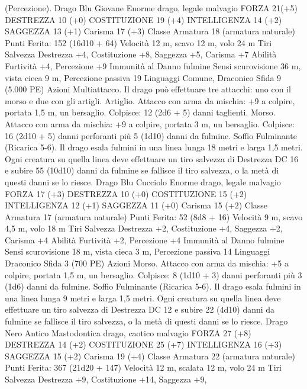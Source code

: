 \begin{multicols}{2}
(Percezione).
Drago Blu Giovane
Enorme drago, legale malvagio
FORZA 21(+5)
DESTREZZA 10 (+0)
COSTITUZIONE 19 (+4)
INTELLIGENZA 14 (+2)
SAGGEZZA 13 (+1)
Carisma 17 (+3)
Classe Armatura 18 (armatura naturale)
\hspace*{0pt}\hfill{Punti Ferita}: 152 (16d10 + 64)
Velocità 12 m, scavo 12 m, volo 24 m
Tiri Salvezza Destrezza +4, Costituzione +8, Saggezza +5,
Carisma +7
Abilità Furtività +4, Percezione +9
Immunità al Danno fulmine
Sensi scurovisione 36 m, vista cieca 9 m, Percezione passiva 19
Linguaggi Comune, Draconico
Sfida 9 (5.000 PE)
Azioni
Multiattacco. Il drago può effettuare tre attacchi: uno con il
morso e due con gli artigli.
Artiglio. Attacco con arma da mischia: +9 a colpire, portata 1,5
m, un bersaglio.
Colpisce: 12 (2d6 + 5) danni taglienti.
Morso. Attacco con arma da mischia: +9 a colpire, portata 3 m,
un bersaglio.
Colpisce: 16 (2d10 + 5) danni perforanti più 5 (1d10) danni da
fulmine.
Soffio Fulminante (Ricarica 5-6). Il drago esala fulmini in una linea
lunga 18 metri e larga 1,5 metri. Ogni creatura su quella linea deve
effettuare un tiro salvezza di Destrezza DC 16 e subire 55 (10d10) danni
da fulmine se fallisce il tiro salvezza, o la metà di questi danni se lo riesce.
Drago Blu Cucciolo
Enorme drago, legale malvagio
FORZA 17 (+3)
DESTREZZA 10 (+0)
COSTITUZIONE 15 (+2)
INTELLIGENZA 12 (+1)
SAGGEZZA 11 (+0)
Carisma 15 (+2)
Classe Armatura 17 (armatura naturale)
\hspace*{0pt}\hfill{Punti Ferita}: 52 (8d8 + 16)
Velocità 9 m, scavo 4,5 m, volo 18 m
Tiri Salvezza Destrezza +2, Costituzione +4, Saggezza +2,
Carisma +4
Abilità Furtività +2, Percezione +4
Immunità al Danno fulmine
Sensi scurovisione 18 m, vista cieca 3 m, Percezione passiva 14
Linguaggi Draconico
Sfida 3 (700 PE)
Azioni
Morso. Attacco con arma da mischia: +5 a colpire, portata 1,5
m, un bersaglio.
Colpisce: 8 (1d10 + 3) danni perforanti più 3 (1d6) danni da
fulmine.
Soffio Fulminante (Ricarica 5-6). Il drago esala fulmini in una
linea lunga 9 metri e larga 1,5 metri. Ogni creatura su quella
linea deve effettuare un tiro salvezza di Destrezza DC 12 e subire
22 (4d10) danni da fulmine se fallisce il tiro salvezza, o la metà
di questi danni se lo riesce.
Drago Nero Antico
Mastodontica drago, caotico malvagio
FORZA 27 (+8)
DESTREZZA 14 (+2)
COSTITUZIONE 25 (+7)
INTELLIGENZA 16 (+3)
SAGGEZZA 15 (+2)
Carisma 19 (+4)
Classe Armatura 22 (armatura naturale)
\hspace*{0pt}\hfill{Punti Ferita}: 367 (21d20 + 147)
Velocità 12 m, scalata 12 m, volo 24 m
Tiri Salvezza Destrezza +9, Costituzione +14, Saggezza +9,

\end{multicols}
